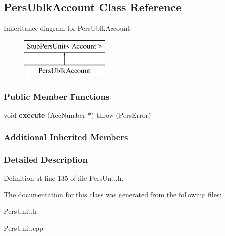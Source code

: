 \hypertarget{classPersUblkAccount}{\subsection{Pers\-Ublk\-Account Class Reference}
\label{d6/d3f/classPersUblkAccount}
}
Inheritance diagram for Pers\-Ublk\-Account\-:\begin{figure}[H]
\begin{center}
\leavevmode
\includegraphics[height=2.000000cm]{d6/d3f/classPersUblkAccount}
\end{center}
\end{figure}
\subsubsection*{Public Member Functions}
\begin{DoxyCompactItemize}
\item 
\hypertarget{classPersUblkAccount_a54c2da815d702cdb200c88cd802f7dd2}{void {\bfseries execute} (\hyperlink{classAccNumber}{Acc\-Number} $\ast$)  throw (\-Pers\-Error)}\label{d6/d3f/classPersUblkAccount_a54c2da815d702cdb200c88cd802f7dd2}

\end{DoxyCompactItemize}
\subsubsection*{Additional Inherited Members}


\subsubsection{Detailed Description}


Definition at line 135 of file Pers\-Unit.\-h.



The documentation for this class was generated from the following files\-:\begin{DoxyCompactItemize}
\item 
Pers\-Unit.\-h\item 
Pers\-Unit.\-cpp\end{DoxyCompactItemize}
